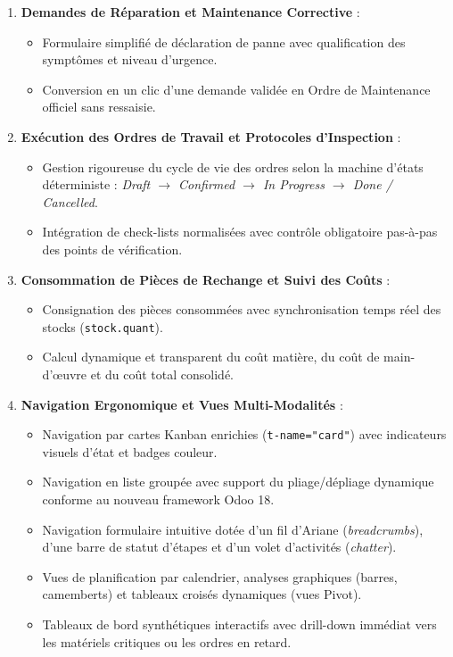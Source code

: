 \begin{enumerate}[leftmargin=1.2cm, label=\textbf{EF\arabic*.}]
    \item \textbf{Demandes de Réparation et Maintenance Corrective} :
    \begin{itemize}
        \item Formulaire simplifié de déclaration de panne avec qualification des symptômes et niveau d'urgence.
        \item Conversion en un clic d'une demande validée en Ordre de Maintenance officiel sans ressaisie.
    \end{itemize}

    \item \textbf{Exécution des Ordres de Travail et Protocoles d'Inspection} :
    \begin{itemize}
        \item Gestion rigoureuse du cycle de vie des ordres selon la machine d'états déterministe : \textit{Draft $\rightarrow$ Confirmed $\rightarrow$ In Progress $\rightarrow$ Done / Cancelled}.
        \item Intégration de check-lists normalisées avec contrôle obligatoire pas-à-pas des points de vérification.
    \end{itemize}

    \item \textbf{Consommation de Pièces de Rechange et Suivi des Coûts} :
    \begin{itemize}
        \item Consignation des pièces consommées avec synchronisation temps réel des stocks (\texttt{stock.quant}).
        \item Calcul dynamique et transparent du coût matière, du coût de main-d'œuvre et du coût total consolidé.
    \end{itemize}

    \item \textbf{Navigation Ergonomique et Vues Multi-Modalités} :
    \begin{itemize}
        \item Navigation par cartes Kanban enrichies (\texttt{t-name="card"}) avec indicateurs visuels d'état et badges couleur.
        \item Navigation en liste groupée avec support du pliage/dépliage dynamique conforme au nouveau framework Odoo 18.
        \item Navigation formulaire intuitive dotée d'un fil d'Ariane (\textit{breadcrumbs}), d'une barre de statut d'étapes et d'un volet d'activités (\textit{chatter}).
        \item Vues de planification par calendrier, analyses graphiques (barres, camemberts) et tableaux croisés dynamiques (vues Pivot).
        \item Tableaux de bord synthétiques interactifs avec drill-down immédiat vers les matériels critiques ou les ordres en retard.
    \end{itemize}


\end{enumerate}
